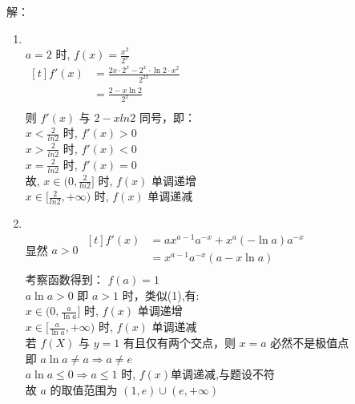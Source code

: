 \documentclass[class=ctexart,crop=false]{standalone}
\begin{document}
解：
\begin{enumerate}[label=(\arabic*)]
	\item \quad\\
	      $a=2$ 时, $f(x)=\frac{x^2}{2^x}$\\
	      $\begin{aligned}[t]
			      f'(x) & =\frac{2x \cdot2^x-2^x\cdot \ln{2}\cdot x^2}{2^{2x}} \\
			            & =\frac{2-x\ln{2}}{2^{x}}                             \\
		      \end{aligned}$\\
	      则 $f'(x)$ 与 $2-xln2$ 同号，即：\\
	      $x<\frac{2}{ln2}$ 时, $f'(x)>0$\\
	      $x>\frac{2}{ln2}$ 时, $f'(x)<0$\\
	      $x=\frac{2}{ln2}$ 时, $f'(x)=0$\\
	      故, $x \in (0,\frac{2}{ln2}]$ 时, $f(x)$ 单调递增\\
$x \in [\frac{2}{ln2},+\infty)$ 时, $f(x)$ 单调递减
	\item \quad\\
显然 $a>0$
$\begin{aligned}[t]
		f'(x) & =ax^{a-1}a^{-x}+x^a(-\ln{a})a^{-x} \\
		      & =x^{a-1}a^{-x}(a-x\ln{a})          \\
	\end{aligned}$\\
考察函数得到： $f(a)=1$\\
$a\ln{a}>0$ 即 $a>1$ 时，类似(1),有:\\
	      $x \in (0,\frac{a}{\ln{a}}]$ 时, $f(x)$ 单调递增\\
$x \in [\frac{a}{\ln{a}},+\infty)$ 时, $f(x)$ 单调递减\\
	      若 $f(X)$ 与 $y=1$ 有且仅有两个交点，则 $x=a$ 必然不是极值点\\
即 $a\ln{a} \neq a \Rightarrow a \neq e$\\
$a\ln{a} \leqslant 0 \Rightarrow a \leqslant 1$ 时,
$f(x)$单调递减,与题设不符\\
故 $a$ 的取值范围为 $(1,e)\cup (e,+\infty)$
\end{enumerate}
\end{document}
